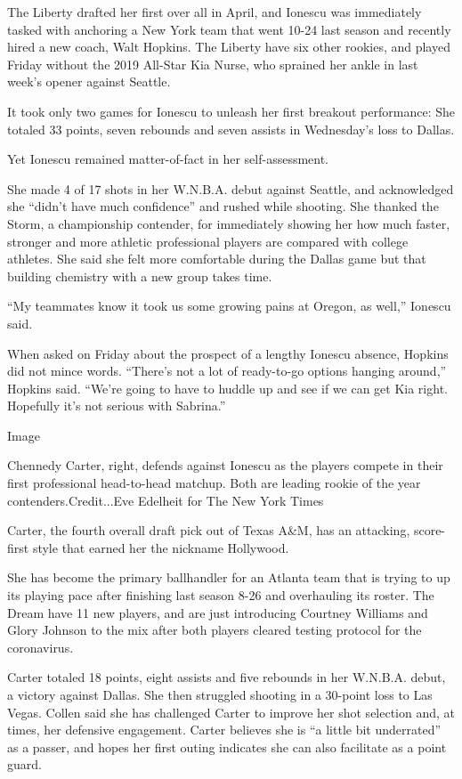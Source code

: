 The Liberty drafted her first over all in April, and Ionescu was
immediately tasked with anchoring a New York team that went 10-24 last
season and recently hired a new coach, Walt Hopkins. The Liberty have
six other rookies, and played Friday without the 2019 All-Star Kia
Nurse, who sprained her ankle in last week's opener against Seattle.

It took only two games for Ionescu to unleash her first breakout
performance: She totaled 33 points, seven rebounds and seven assists in
Wednesday's loss to Dallas.

Yet Ionescu remained matter-of-fact in her self-assessment.

She made 4 of 17 shots in her W.N.B.A. debut against Seattle, and
acknowledged she ``didn't have much confidence'' and rushed while
shooting. She thanked the Storm, a championship contender, for
immediately showing her how much faster, stronger and more athletic
professional players are compared with college athletes. She said she
felt more comfortable during the Dallas game but that building chemistry
with a new group takes time.

``My teammates know it took us some growing pains at Oregon, as well,''
Ionescu said.

When asked on Friday about the prospect of a lengthy Ionescu absence,
Hopkins did not mince words. ``There's not a lot of ready-to-go options
hanging around,'' Hopkins said. ``We're going to have to huddle up and
see if we can get Kia right. Hopefully it's not serious with Sabrina.''

Image

Chennedy Carter, right, defends against Ionescu as the players compete
in their first professional head-to-head matchup. Both are leading
rookie of the year contenders.Credit...Eve Edelheit for The New York
Times

Carter, the fourth overall draft pick out of Texas A\&M, has an
attacking, score-first style that earned her the nickname Hollywood.

She has become the primary ballhandler for an Atlanta team that is
trying to up its playing pace after finishing last season 8-26 and
overhauling its roster. The Dream have 11 new players, and are just
introducing Courtney Williams and Glory Johnson to the mix after both
players cleared testing protocol for the coronavirus.

Carter totaled 18 points, eight assists and five rebounds in her
W.N.B.A. debut, a victory against Dallas. She then struggled shooting in
a 30-point loss to Las Vegas. Collen said she has challenged Carter to
improve her shot selection and, at times, her defensive engagement.
Carter believes she is ``a little bit underrated'' as a passer, and
hopes her first outing indicates she can also facilitate as a point
guard.

